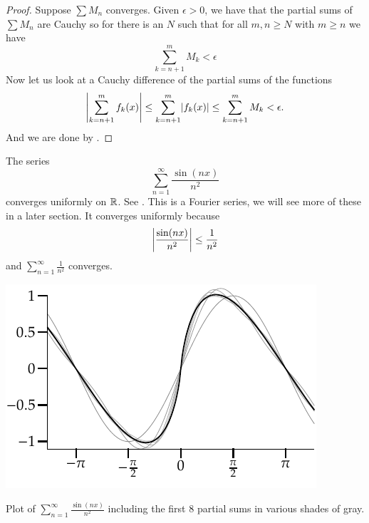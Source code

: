 \begin{proof}
Suppose $\sum M_n$ converges.  Given $\epsilon > 0$,
we have that the partial sums of $\sum M_n$ are Cauchy so for
there is an $N$ such that for all $m, n \geq N$ with $m \geq n$ we have
\begin{equation*}
\sum_{k=n+1}^m M_k < \epsilon
\end{equation*}
Now let us look at a Cauchy difference of the partial
sums of the functions
\begin{equation*}
\left\lvert {\sum_{k=n+1}^m f_k(x)} \right\rvert \leq
\sum_{k=n+1}^m \lvert {f_k(x)} \rvert \leq
\sum_{k=n+1}^m M_k < \epsilon .
\end{equation*}
And we are done by .
\end{proof}

\begin{example} \label{example:sinnsqfourier}
The series
\begin{equation*}
\sum_{n=1}^\infty \frac{\sin(nx)}{n^2}
\end{equation*}
converges uniformly on ${\mathbb{R}}$.  See .
This is a Fourier series,
we will see more of these in a later section.  It converges uniformly because
\begin{equation*}
\left\lvert {\frac{\sin(nx)}{n^2}} \right\rvert \leq 
\frac{1}{n^2}
\end{equation*}
and
$\sum_{n=1}^\infty \frac{1}{n^2}$
converges.
\end{example}

\begin{myfigureht}
\includegraphics{figures/fouriersern2}
\caption{Plot of 
$\sum_{n=1}^\infty \frac{\sin(n x)}{n^2}$ including
the first 8 partial sums in various shades of gray.\label{fig:fouriersern2}}
\end{myfigureht}

